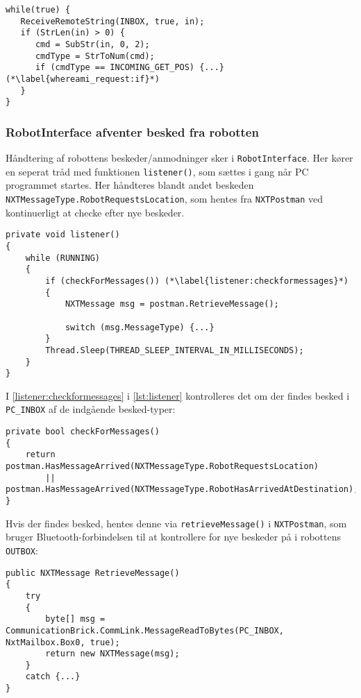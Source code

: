 \begin{lstlisting}[style=csmall,label=lst:whereami_response,caption=Robotten venter på svar]
while(true) {
   ReceiveRemoteString(INBOX, true, in);
   if (StrLen(in) > 0) {
      cmd = SubStr(in, 0, 2);
      cmdType = StrToNum(cmd);
      if (cmdType == INCOMING_GET_POS) {...} (*\label{whereami_request:if}*)
   }
}
\end{lstlisting}

\subsubsection{RobotInterface afventer besked fra robotten}
Håndtering af robottens beskeder/anmodninger sker i \lstinline[style=csharp]!RobotInterface!.
Her kører en seperat tråd med funktionen \lstinline[style=csharp]!listener()!, som sættes i gang når PC programmet startes.
Her håndteres blandt andet beskeden \lstinline[style=csharp]!NXTMessageType.RobotRequestsLocation!, som hentes fra \lstinline[style=csharp]!NXTPostman! ved kontinuerligt at checke efter nye beskeder.

\begin{lstlisting}[style=csharpsmall,label=lst:listener,caption=listener() i RobotInterface]
private void listener()
{
    while (RUNNING)
    {
        if (checkForMessages()) (*\label{listener:checkformessages}*)
        {
            NXTMessage msg = postman.RetrieveMessage();

            switch (msg.MessageType) {...}
        }
        Thread.Sleep(THREAD_SLEEP_INTERVAL_IN_MILLISECONDS);
    }
}
\end{lstlisting}

I \cref{listener:checkformessages} i \cref{lst:listener} kontrolleres det om der findes besked i \lstinline[style=csharp]!PC_INBOX! af de indgående besked-typer:

\begin{lstlisting}[style=csharpsmall,label=lst:checkformessages]
private bool checkForMessages()
{
    return postman.HasMessageArrived(NXTMessageType.RobotRequestsLocation)
        || postman.HasMessageArrived(NXTMessageType.RobotHasArrivedAtDestination);
}
\end{lstlisting}

Hvis der findes besked, hentes denne via \lstinline[style=csharp]!retrieveMessage()! i \lstinline[style=csharp]!NXTPostman!, som bruger Bluetooth-forbindelsen til at kontrollere for nye beskeder på i robottens \lstinline[style=c]!OUTBOX!:

\begin{lstlisting}[style=csharpsmall,label=lst:postman,caption=NXTPostman henter besked fra robot]
public NXTMessage RetrieveMessage()
{
    try
    {
        byte[] msg = CommunicationBrick.CommLink.MessageReadToBytes(PC_INBOX, NxtMailbox.Box0, true);
        return new NXTMessage(msg);
    }
    catch {...}
}
\end{lstlisting}

